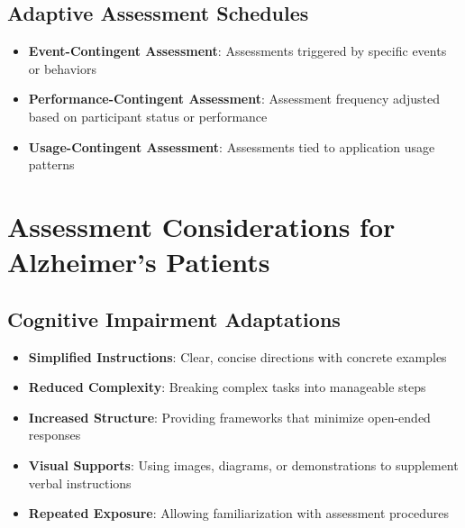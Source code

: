 \subsection{Adaptive Assessment Schedules}
\begin{itemize}
    \item \textbf{Event-Contingent Assessment}: Assessments triggered by specific events or behaviors
    
    \item \textbf{Performance-Contingent Assessment}: Assessment frequency adjusted based on participant status or performance
    
    \item \textbf{Usage-Contingent Assessment}: Assessments tied to application usage patterns
\end{itemize}

\section{Assessment Considerations for Alzheimer's Patients}
\subsection{Cognitive Impairment Adaptations}
\begin{itemize}
    \item \textbf{Simplified Instructions}: Clear, concise directions with concrete examples
    
    \item \textbf{Reduced Complexity}: Breaking complex tasks into manageable steps
    
    \item \textbf{Increased Structure}: Providing frameworks that minimize open-ended responses
    
    \item \textbf{Visual Supports}: Using images, diagrams, or demonstrations to supplement verbal instructions
    
    \item \textbf{Repeated Exposure}: Allowing familiarization with assessment procedures
\end{itemize}

